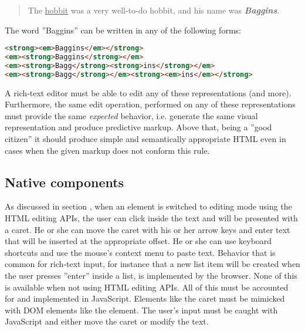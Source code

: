 \begin{quotation}
The \underline{hobbit} was a very well-to-do hobbit, and his name was \textbf{\textit{Baggins}}.
\end{quotation}

\noindent The word ''Baggins'' can be written in any of the following forms:

\begin{lstlisting}[language=html, caption=Different DOM representations of an equally formatted text, label=lst:different-dom-representations]
<strong><em>Baggins</em></strong>
<em><strong>Baggins</strong></em>
<em><strong>Bagg</strong><strong>ins</strong></em>
<em><strong>Bagg</strong></em><strong><em>ins</em></strong>
\end{lstlisting}

A rich-text editor must be able to edit any of these representations (and more). Furthermore, the same edit operation, performed on any of these representations must provide the same \textit{expected} behavior, i.e. generate the same visual representation and produce predictive markup. Above that, being a ''good citizen'' it should produce simple and semantically appropriate HTML even in cases when the given markup does not conform this rule.%




\subsection{Native components}
\label{subsec:disadv_mimic_native}

As discussed in section , when an element is switched to editing mode using the HTML editing APIs, the user can click inside the text and will be presented with a caret. He or she can move the caret with his or her arrow keys and enter text that will be inserted at the appropriate offset. He or she can use keyboard shortcuts and use the mouse's context menu to paste text. Behavior that is common for rich-text input, for instance that a new list item will be created when the user presses ''enter'' inside a list, is implemented by the browser. None of this is available when not using HTML editing APIs. All of this must be accounted for and implemented in JavaScript. Elements like the caret must be mimicked with DOM elements like the  element. The user's input must be caught with JavaScript and either move the caret or modify the text.


